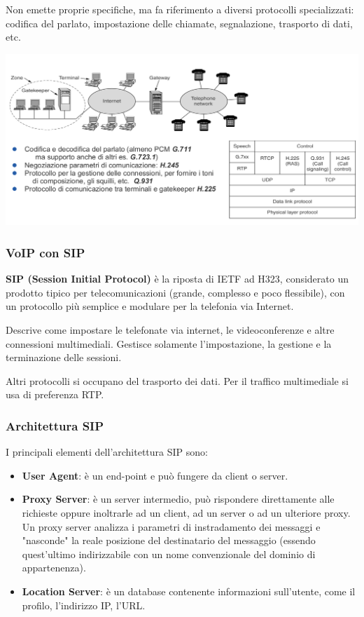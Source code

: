            Non emette proprie specifiche, ma fa riferimento a diversi protocolli specializzati: codifica del parlato, impostazione delle chiamate, segnalazione, trasporto di dati, etc.

            \begin{center}
                \includegraphics[scale=0.30]{chapters/6/assets/schema_zd.png}
            \end{center}

        \subsubsection{VoIP con SIP}
            \textbf{SIP (Session Initial Protocol)} è la riposta di IETF ad H323, considerato un prodotto tipico per telecomunicazioni (grande, complesso e poco flessibile), con un protocollo più semplice e modulare per la telefonia via Internet.
        
            Descrive come impostare le telefonate via internet, le videoconferenze e altre connessioni multimediali. Gestisce solamente l'impostazione, la gestione e la terminazione delle sessioni.
        
            Altri protocolli si occupano del trasporto dei dati. Per il traffico multimediale si usa di preferenza RTP.

        \subsubsection{Architettura SIP}
            I principali elementi dell'architettura SIP sono:
            \begin{itemize}
                \item \textbf{User Agent}: è un end-point e può fungere da client o server.
                \item \textbf{Proxy Server}: è un server intermedio, può rispondere direttamente alle richieste oppure inoltrarle ad un client, ad un server o ad un ulteriore proxy.
                Un proxy server analizza i parametri di instradamento dei messaggi e "nasconde" la reale posizione del destinatario del messaggio (essendo quest'ultimo indirizzabile con un nome convenzionale del dominio di appartenenza).
                \item \textbf{Location Server}: è un database contenente informazioni sull'utente, come il profilo, l'indirizzo IP, l'URL.
            \end{itemize}

